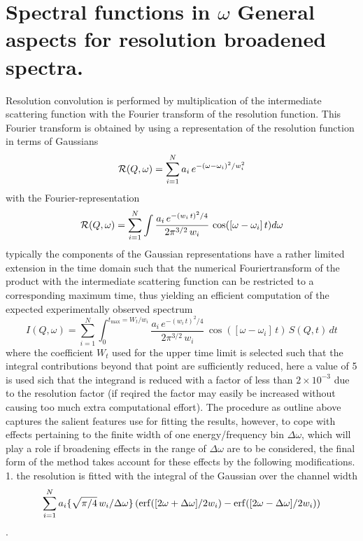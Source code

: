 \documentclass[11pt,fleqn]{book} %
\newcommand{\desc}[1]{\hskip 0.5cm {\color{descgray} #1}}
\begin{document}
\chapter{Spectral functions in ${\omega}$ \desc{General aspects for resolution broadened spectra.}}
\label{cha:spec}
Resolution convolution is performed by multiplication of the intermediate scattering function with the
Fourier transform of the resolution function. This Fourier transform is obtained by using a representation 
of the resolution function in terms of Gaussians
\begin{equation}
\label{eg:gares}
{\cal R}(Q,\omega) = \sum_{i=1}^{N} { a_i \, e^{-(\omega-\omega_i)^2/w_i^2} }
\end{equation}
with the Fourier-representation
\begin{equation}
\label{eg:garesF}
{\cal R}(Q,\omega) = \sum_{i=1}^{N} {\int \frac{a_i \, e^{-(w_i \, t)^2/4}}{ 2 \pi^{3/2} \, w_i }\, \cos([\omega-\omega_i]\,t) d\omega}
\end{equation}
typically the components of the Gaussian representations have a rather limited extension in
the time domain such that the numerical Fouriertransform of the product with the intermediate
scattering function can be restricted to a corresponding maximum time, thus yielding an 
efficient computation of the expected experimentally observed spectrum
\begin{equation}
\label{eq:conv1}
I(Q,\omega) = \sum_{i=1}^{N} { \int_0^{t_{\max} = W_t/w_i} {
\frac{a_i \, e^{-(w_i \, t)^2/4}}{ 2 \pi^{3/2} \, w_i } \, \cos([\omega-\omega_i]\, t) \, S(Q,t) \, dt 
}}
\end{equation}
where the coefficient $W_t$ used for the upper time limit is selected such that the integral
contributions beyond that point are sufficiently reduced, here a value of 5 is used sich that
the integrand is reduced with a factor of less than $2 \times 10^{-3}$ due to the resolution
factor (if reqired the factor may easily be increased without causing too much extra computational effort). 
The procedure as outline above captures the salient features use for fitting the results,
however, to cope with effects pertaining to the finite width of one energy/frequency bin
$\Delta \omega$, which will play a role if broadening effects in the range of $\Delta \omega$
are to be considered, the final form of the method takes account for these effects by the
following modifications.
1. the resolution is fitted with the integral of the Gaussian over the channel width 
%
\begin{equation} 
\sum_{i=1}^{N} { a_i \{ \sqrt{\pi/4}\, w_i/\Delta \omega \} \,(
{\rm erf}([2\omega+\Delta \omega]/2w_i)-{\rm erf}([2\omega-\Delta\omega]/2w_i)) 
}
\end{equation}
.
\end{document}
